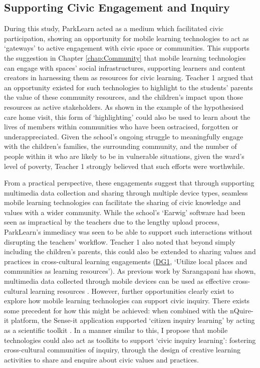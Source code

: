 \subsection{Supporting Civic Engagement and Inquiry}

During this study, ParkLearn acted as a medium which facilitated civic participation, showing an opportunity for mobile learning technologies to act as `gateways' to active engagement with civic space or communities. This supports the suggestion in Chapter \ref{chap:Community} that mobile learning technologies can engage with spaces’ social infrastructures, supporting learners and content creators in harnessing them as resources for civic learning. Teacher 1 argued that an opportunity existed for such technologies to highlight to the students' parents the value of these community resources, and the children’s impact upon those resources as active stakeholders. As shown in the example of the hypothesised care home visit, this form of `highlighting' could also be used to learn about the lives of members within communities who have been ostracised, forgotten or underappreciated. Given the school's ongoing struggle to meaningfully engage with the children's families, the surrounding community, and the number of people within it who are likely to be in vulnerable situations, given the ward's level of poverty, Teacher 1 strongly believed that such efforts were worthwhile.

From a practical perspective, these engagements suggest that through supporting multimedia data collection and sharing through multiple device types, seamless mobile learning technologies can facilitate the sharing of civic knowledge and values with a wider community. While the school's ‘Earwig’ software had been seen as impractical by the teachers due to the lengthy upload process, ParkLearn’s immediacy was seen to be able to support such interactions without disrupting the teachers’ workflow. Teacher 1 also noted that beyond simply including the children’s parents, this could also be extended to sharing values and practices in cross-cultural learning engagements (\hyperref[DG1]{DG1}, `Utilize local places and communities as learning resources'). As previous work by Sarangapani has shown, multimedia data collected through mobile devices can be used as effective cross-cultural learning resources \citep{Sarangapani2016}. However, further opportunities clearly exist to explore how mobile learning technologies can support civic inquiry. There exists some precedent for how this might be achieved: when combined with the nQuire-it platform, the Sense-it application supported ‘citizen inquiry learning’ by acting as a scientific toolkit \citep{Sharples2017}. In a manner similar to this, I propose that mobile technologies could also act as toolkits to support ‘civic inquiry learning’: fostering cross-cultural communities of inquiry, through the design of creative learning activities to share and enquire about civic values and practices.

